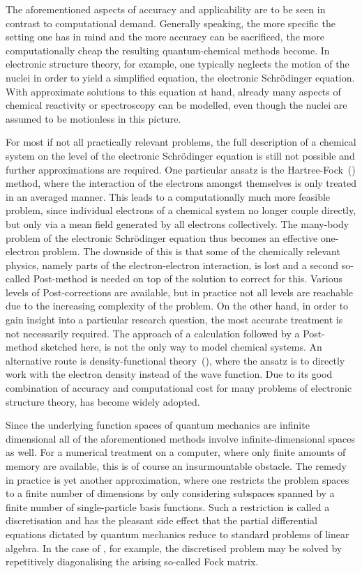 The aforementioned aspects of accuracy and applicability
are to be seen in contrast to computational demand.
Generally speaking, the more specific the setting one has in mind
and the more accuracy can be sacrificed,
the more computationally cheap the resulting quantum-chemical methods become.
In electronic structure theory, for example,
one typically neglects the motion of the nuclei
in order to yield a simplified equation, the electronic Schrödinger equation.
With approximate solutions to this equation
at hand, already many aspects of chemical reactivity or spectroscopy
can be modelled, even though the nuclei are assumed to be motionless in this picture.

For most if not all practically relevant problems,
the full description of a chemical system
on the level of the electronic Schrödinger equation is still not possible
and further approximations are required.
One particular ansatz is the Hartree-Fock~(\HF) method,
where the interaction of the electrons amongst themselves
is only treated in an averaged manner.
This leads to a computationally much more feasible problem,
since individual electrons of a chemical system no longer couple directly,
but only via a mean field generated by all electrons collectively.
The many-body problem of the electronic Schrödinger equation
thus becomes an effective one-electron problem.
The downside of this is that some of the chemically relevant physics,
namely parts of the electron-electron interaction, is lost
and a second so-called Post-\HF method is needed
on top of the \HF solution to correct for this.
Various levels of Post-\HF corrections are available,
but in practice not all levels are reachable due to the
increasing complexity of the problem.
On the other hand, in order to gain insight
into a particular research question,
the most accurate treatment is not necessarily required.
The approach of a \HF calculation followed by a Post-\HF method sketched here,
is not the only way to model chemical systems.
An alternative route is density-functional theory~(\DFT),
where the ansatz is to directly work with the electron density
instead of the wave function.
Due to its good combination of accuracy and computational cost
for many problems of electronic structure theory,
\DFT has become widely adopted.

Since the underlying function spaces of quantum mechanics are infinite dimensional
all of the aforementioned methods
involve infinite-dimensional spaces as well.
For a numerical treatment on a computer,
where only finite amounts of memory are available,
this is of course an insurmountable obstacle.
The remedy in practice is yet another approximation,
where one restricts the problem spaces
to a finite number of dimensions by only considering subspaces
spanned by a finite number of single-particle basis functions.
Such a restriction is called a discretisation
and has the pleasant side effect that the partial differential equations
dictated by quantum mechanics
reduce to standard problems of linear algebra.
In the case of \HF, for example,
the discretised problem may be solved by repetitively diagonalising
the arising so-called Fock matrix.

